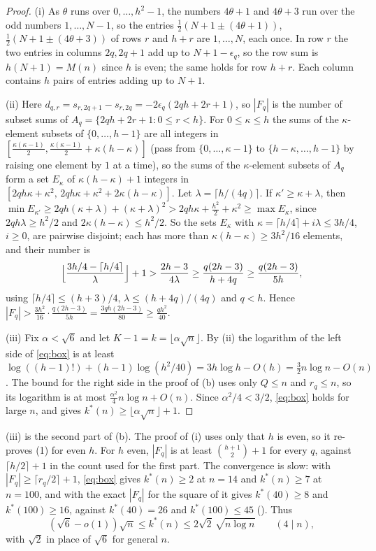 \begin{proof}
(i) As $\theta$ runs over $0,\dots,h^2-1$, the numbers $4\theta+1$ and $4\theta+3$ run over the odd numbers $1,\dots,N-1$, so the entries $\frac12(N+1\pm(4\theta+1))$, $\frac12(N+1\pm(4\theta+3))$ of rows $r$ and $h+r$ are $1,\dots,N$, each once.
In row $r$ the two entries in columns $2q,2q+1$ add up to $N+1-\epsilon_q$, so the row sum is $h(N+1)=M(n)$ since $h$ is even; the same holds for row $h+r$.
Each column contains $h$ pairs of entries adding up to $N+1$.

(ii) Here $d_{q,r}=s_{r,2q+1}-s_{r,2q}=-2\epsilon_q(2qh+2r+1)$, so $|F_q|$ is the number of subset sums of $A_q=\{2qh+2r+1:0\le r<h\}$.
For $0\le\kappa\le h$ the sums of the $\kappa$-element subsets of $\{0,\dots,h-1\}$ are all integers in $[\frac{\kappa(\kappa-1)}2,\frac{\kappa(\kappa-1)}2+\kappa(h-\kappa)]$ (pass from $\{0,\dots,\kappa-1\}$ to $\{h-\kappa,\dots,h-1\}$ by raising one element by $1$ at a time), so the sums of the $\kappa$-element subsets of $A_q$ form a set $E_\kappa$ of $\kappa(h-\kappa)+1$ integers in $[2qh\kappa+\kappa^2,\,2qh\kappa+\kappa^2+2\kappa(h-\kappa)]$.
Let $\lambda=\lceil h/(4q)\rceil$.
If $\kappa'\ge\kappa+\lambda$, then $\min E_{\kappa'}\ge2qh(\kappa+\lambda)+(\kappa+\lambda)^2>2qh\kappa+\frac{h^2}2+\kappa^2\ge\max E_\kappa$, since $2qh\lambda\ge h^2/2$ and $2\kappa(h-\kappa)\le h^2/2$.
So the sets $E_\kappa$ with $\kappa=\lceil h/4\rceil+i\lambda\le 3h/4$, $i\ge0$, are pairwise disjoint; each has more than $\kappa(h-\kappa)\ge3h^2/16$ elements, and their number is
\[
\Bigl\lfloor\frac{3h/4-\lceil h/4\rceil}{\lambda}\Bigr\rfloor+1>\frac{2h-3}{4\lambda}\ge\frac{q(2h-3)}{h+4q}\ge\frac{q(2h-3)}{5h},
\]
using $\lceil h/4\rceil\le(h+3)/4$, $\lambda\le(h+4q)/(4q)$ and $q<h$.
Hence $|F_q|>\frac{3h^2}{16}\cdot\frac{q(2h-3)}{5h}=\frac{3qh(2h-3)}{80}\ge\frac{qh^2}{40}$.

(iii) Fix $\alpha<\sqrt6$ and let $K-1=k=\lfloor\alpha\sqrt n\rfloor$.
By (ii) the logarithm of the left side of \eqref{eq:box} is at least $\log((h-1)!)+(h-1)\log(h^2/40)=3h\log h-O(h)=\frac32n\log n-O(n)$.
The bound for the right side in the proof of (b) uses only $Q\le n$ and $r_q\le n$, so its logarithm is at most $\frac{\alpha^2}4n\log n+O(n)$.
Since $\alpha^2/4<3/2$, \eqref{eq:box} holds for large $n$, and  gives $k^*(n)\ge\lfloor\alpha\sqrt n\rfloor+1$.
\end{proof}

(iii) is the second part of (b).
The proof of (i) uses only that $h$ is even, so it re-proves (1) for even $h$.
For $h$ even, $|F_q|$ is at least $\binom{h+1}2+1$ for every $q$, against $\lceil h/2\rceil+1$ in the count used for the first part.
The convergence is slow: with $|F_q|\ge\lceil r_q/2\rceil+1$, \eqref{eq:box} gives $k^*(n)\ge2$ at $n=14$ and $k^*(n)\ge7$ at $n=100$, and with the exact $|F_q|$ for the square of  it gives $k^*(40)\ge8$ and $k^*(100)\ge16$, against $k^*(40)=26$ and $k^*(100)\le45$ ().
Thus
\[
(\sqrt6-o(1))\sqrt n\le k^*(n)\le2\sqrt2\,\sqrt{n\log n}\qquad(4\mid n),
\]
with $\sqrt2$ in place of $\sqrt6$ for general $n$.

